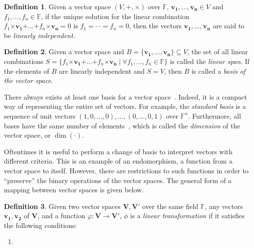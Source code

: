 \documentclass[draft, 12pt, a4paper, oneside]{memoir}
\theoremstyle{definition}
\newtheorem{definition}{Definition}[section]
\theoremstyle{remark}
\begin{document}
\begin{definition}
  Given a vector space $(V, \bm{+}, \bm{\times})$ over $\mathbb{F}$, $\mathbf{v_{1}}, \dots, \mathbf{v_{n}} \in V$ and $f_{1}, \dots, f_{n} \in \mathbb{F}$, if the unique solution for the linear combination $f_{1} \bm{\times} \mathbf{v_{1}} \bm{+} \dots \bm{+} f_{n} \bm{\times} \mathbf{v_{n}} = 0$ is $f_{1} = \cdots = f_{n} = 0$, then the vectors $\mathbf{v_{1}}, \dots, \mathbf{v_{n}}$ are said to be \emph{linearly independent}.
\end{definition}

\begin{definition}
  Given a vector space and $B = \{\mathbf{v_{1}}, \dots, \mathbf{v_{n}}\} \subseteq V$, the set of all linear combinations $S = \{ f_{1} \bm{\times} \mathbf{v_{1}} \bm{+} \dots \bm{+} f_{n} \bm{\times} \mathbf{v_{n}} \mid \forall f_{1}, \dots, f_{n} \in \mathbb{F} \}$ is called the \emph{linear span}. If the elements of $B$ are linearly independent and $S = V$, then $B$ is called a \emph{basis of the vector space}.
\end{definition}

There always exists at least one basis for a vector space~\cite{}. Indeed, it is a compact way of representing the entire set of vectors. For example, the \emph{standard basis} is a sequence of unit vectors $(1, 0, \dots, 0), \dots, (0, \dots, 0, 1)$ over $\mathbb{F}^{n}$. Furthermore, all bases have the same number of elements~\cite{}, which is called the \emph{dimension} of the vector space, or $\dim(\cdot)$. 

Oftentimes it is useful to perform a change of basis to interpret vectors with different criteria. This is an example of an endomorphism, a function from a vector space to itself. However, there are restrictions to such functions in order to ``preserve'' the binary operations of the vector spaces. The general form of a mapping between vector spaces is given below.

\begin{definition}
  Given two vector spaces $\mathbf{V}, \mathbf{V'}$ over the same field $\mathbb{F}$, any vectors $\mathbf{v_{1}}, \mathbf{v_{2}}$ of $\mathbf{V}$, and a function $\varphi : \mathbf{V} \to \mathbf{V'}$, $\phi$ is a \emph{linear transformation} if it satisfies the following conditions:
  
  \begin{enumerate}
    \item 
  \end{enumerate}
\end{definition}
\end{document}
